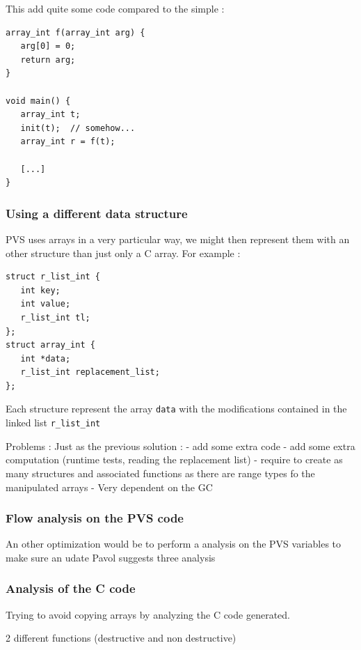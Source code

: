 \documentclass[12pt,a4paper,titlepage]{article}
\newcommand{\cl}[1]{\texttt{#1}}
\begin{document}
This add quite some code compared to the simple :

\begin{lstlisting}
array_int f(array_int arg) {
   arg[0] = 0;
   return arg;
}

void main() {
   array_int t;
   init(t);  // somehow...
   array_int r = f(t);
   
   [...]   
}
\end{lstlisting}



\subsubsection{Using a different data structure}

PVS uses arrays in a very particular way, we might then represent them with an other structure than just only a C array.
For example :

\begin{lstlisting}
struct r_list_int {
   int key;
   int value;
   r_list_int tl;
};
struct array_int {
   int *data;
   r_list_int replacement_list;
};
\end{lstlisting}

Each structure represent the array \cl{data} with the modifications contained in the linked list \cl{r\_list\_int}

Problems : Just as the previous solution :
- add some extra code
- add some extra computation (runtime tests, reading the replacement list)
- require to create as many structures and associated functions as there are range types fo the manipulated arrays
- Very dependent on the GC


\subsubsection{Flow analysis on the PVS code}

An other optimization would be to perform a analysis on the PVS variables to make sure an udate
Pavol \cite{pavol} suggests three analysis



\subsubsection{Analysis of the C code}

Trying to avoid copying arrays by analyzing the C code generated.

2 different functions (destructive and non destructive)
\end{document}
